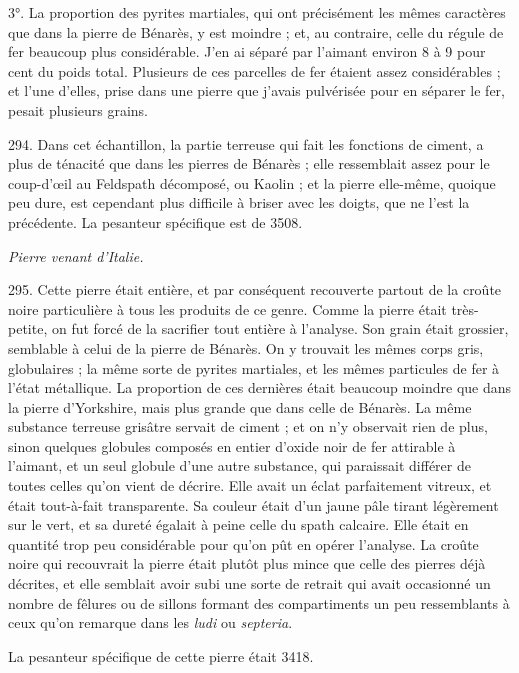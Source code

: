 \documentclass[a4paper, 11pt, oneside, polutonikogreek, french]{article}
\begin{document}
3°. La proportion des pyrites martiales, qui ont précisément les mêmes caractères que dans la pierre de Bénarès, y est moindre ; et, au contraire, celle du régule de fer beaucoup plus considérable. J'en ai séparé par l'aimant environ 8 à 9 pour cent du poids total. Plusieurs de ces parcelles de fer étaient assez considérables ; et l'une d'elles, prise dans une pierre que j'avais pulvérisée pour en séparer le fer, pesait plusieurs grains.

294. Dans cet échantillon, la partie terreuse qui fait les fonctions de ciment, a plus de ténacité que dans les pierres de Bénarès ; elle ressemblait assez pour le coup-d'œil au Feldspath décomposé, ou Kaolin ; et la pierre elle-même, quoique peu dure, est cependant plus difficile à briser avec les doigts, que ne l'est la précédente. La pesanteur spécifique est de 3508.

\begin{center}
\emph{Pierre venant d'Italie.}
\end{center}

295. Cette pierre était entière, et par conséquent recouverte partout de la croûte noire particulière à tous les produits de ce genre. Comme la pierre était très-petite, on fut forcé de la sacrifier tout entière à l'analyse. Son grain était grossier, semblable à celui de la pierre de Bénarès. On y trouvait les mêmes corps gris, globulaires ; la même sorte de pyrites martiales, et les mêmes particules de fer à l'état métallique. La proportion de ces dernières était beaucoup moindre que dans la pierre d'Yorkshire, mais plus grande que dans celle de Bénarès. La même substance terreuse grisâtre servait de ciment ; et on n'y observait rien de plus, sinon quelques globules composés en entier d'oxide noir de fer attirable à l'aimant, et un seul globule d'une autre substance, qui paraissait différer de toutes celles qu'on vient de décrire. Elle avait un éclat parfaitement vitreux, et était tout-à-fait transparente. Sa couleur était d'un jaune pâle tirant légèrement sur le vert, et sa dureté égalait à peine celle du spath calcaire. Elle était en quantité trop peu considérable pour qu'on pût en opérer l'analyse. La croûte noire qui recouvrait la pierre était plutôt plus mince que celle des pierres déjà décrites, et elle semblait avoir subi une sorte de retrait qui avait occasionné un nombre de fêlures ou de sillons formant des compartiments un peu ressemblants à ceux qu'on remarque dans les \emph{ludi} ou \emph{septeria}.

La pesanteur spécifique de cette pierre était 3418.
\end{document}
